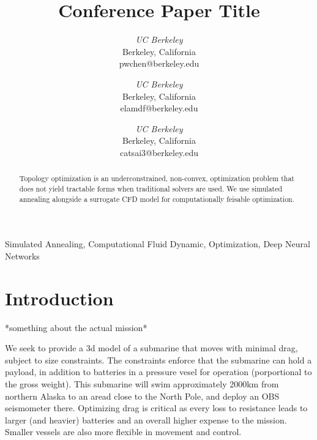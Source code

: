 \documentclass[conference]{IEEEtran}
\begin{document}
\title{Conference Paper Title}
\author{
\textit{UC Berkeley}\\
Berkeley, California \\
pwchen@berkeley.edu
\and
\textit{UC Berkeley}\\
Berkeley, California \\
elamdf@berkeley.edu
\and
{}
\textit{UC Berkeley}\\
Berkeley, California \\
catsai3@berkeley.edu
}

\maketitle

\begin{abstract}
  Topology optimization is an underconstrained, non-convex, optimization problem that does not yield tractable forms when traditional solvers are used. We use simulated annealing alongside a surrogate CFD model for computationally feisable optimization.
\end{abstract}

\begin{IEEEkeywords}
Simulated Annealing, Computational Fluid Dynamic, Optimization, Deep Neural Networks
\end{IEEEkeywords}

\section{Introduction}
*something about the actual mission*

We seek to provide a 3d model of a submarine that moves with minimal drag, subject to size constraints. The constraints enforce that the submarine can hold a payload, in addition to batteries in a pressure vesel for operation (porportional to the gross weight). This submarine will swim approximately 2000km from northern Alaska to an aread close to the North Pole, and deploy an OBS seismometer there. Optimizing drag is critical as every loss to resistance leads to larger (and heavier) batteries and an overall higher expense to the mission. Smaller vessels are also more flexible in movement and control.
\end{document}
